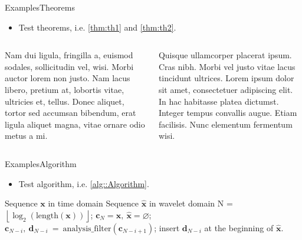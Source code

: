 \documentclass[10pt,xcolor={dvipsnames},aspectratio=169]{beamer}
\begin{document}
\begin{frame}{Examples}{Theorems}
\begin{itemize}
  \item Test theorems, i.e. \cref{thm:th1} and \cref{thm:th2}.
\end{itemize}

\begin{columns}
  \begin{column}{.48\textwidth}
    \begin{theorem} \label{thm:th1}
      Nam dui ligula, fringilla a, euismod
      sodales, sollicitudin vel, wisi. Morbi
      auctor lorem non justo. Nam lacus
      libero, pretium at, lobortis vitae,
      ultricies et, tellus. Donec aliquet,
      tortor sed accumsan bibendum, erat
      ligula aliquet magna, vitae ornare
      odio metus a mi.
    \end{theorem}
  \end{column}
  \begin{column}{.48\textwidth}
    \begin{theorem} \label{thm:th2}
      Quisque ullamcorper placerat ipsum.
      Cras nibh. Morbi vel justo vitae lacus
      tincidunt ultrices. Lorem ipsum dolor
      sit amet, consectetuer adipiscing elit.
      In hac habitasse platea dictumst.
      Integer tempus convallis augue.
      Etiam facilisis. Nunc elementum
      fermentum wisi.
    \end{theorem}
  \end{column}
\end{columns}
\end{frame}


\begin{frame}{Examples}{Algorithm}
\begin{itemize}
  \item Test algorithm, i.e. \cref{alg::Algorithm}.
\end{itemize}

\begin{algorithm}[H]
  \caption{DWT Algorithm}
  \label{alg::Algorithm}
  \begin{algorithmic}[1]
    \REQUIRE Sequence $\mathbf{x}$ in time domain
    \ENSURE Sequence $\hat{\mathbf{x}}$ in wavelet domain
    \STATE N = $\left\lfloor \log_2 (\mathrm{length}(\mathbf{x})) \right\rfloor$;
    \STATE $\mathbf{c}_{N} = \mathbf{x},~ \hat{\mathbf{x}} = \varnothing$;
    \STATE $\mathbf{c}_{N-i},~\mathbf{d}_{N-i}~=~\mathrm{analysis\_filter}(\mathbf{c}_{N-i+1})$;
    \STATE insert $\mathbf{d}_{N-i}$ at the beginning of $\hat{\mathbf{x}}$.
    \ENDFOR
  \end{algorithmic}
\end{algorithm}
\end{frame}


\finalframe
\end{document}
